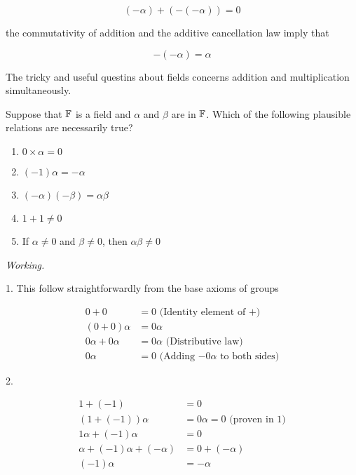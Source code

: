 \begin{equation}
    (-\alpha) + (-(-\alpha)) = 0
\end{equation}

the commutativity of addition and the additive cancellation law imply that

\begin{equation}
    -(-\alpha) = \alpha
\end{equation}

The tricky and useful questins about fields concerns addition and multiplication simultaneously.

\begin{problem}
Suppose that $\mathbb{F}$ is a field and $\alpha$ and $\beta$ are in $\mathbb{F}$. Which of the following plausible relations are necessarily true?

\begin{enumerate}
    \item $0\times\alpha = 0$
    \item $(-1)\alpha = -\alpha$
    \item $(-\alpha)(-\beta) = \alpha\beta$
    \item $1+1 \neq 0$
    \item If $\alpha \neq 0$ and $\beta \neq 0$, then $\alpha\beta \neq 0$
\end{enumerate}
\end{problem}

\textit{Working.}

1. This follow straightforwardly from the base axioms of groups

\begin{align}
    0 + 0             & = 0 \text{ (Identity element of +)}           \\
    (0 + 0) \alpha    & = 0\alpha                                     \\
    0\alpha + 0\alpha & = 0\alpha \text{ (Distributive law)}          \\
    0\alpha           & = 0 \text{ (Adding $-0\alpha$ to both sides)}
\end{align}

2.

\begin{align}
    1 + (-1)                         & = 0                                  \\
    (1 + (-1)) \alpha                & = 0 \alpha = 0 \text{ (proven in 1)} \\
    1\alpha + (-1)\alpha             & = 0                                  \\
    \alpha + (-1) \alpha + (-\alpha) & = 0 + (-\alpha)                      \\
    (-1) \alpha                      & = -\alpha
\end{align}

